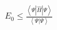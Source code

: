 \documentclass[preview]{standalone}
\begin{document}
\begin{center}
$E_0 \leq \frac{\left<\Psi\left|\hat{H}\right|\Psi\right>}{\left<\Psi|\Psi\right>}$
\end{center}
\end{document}
